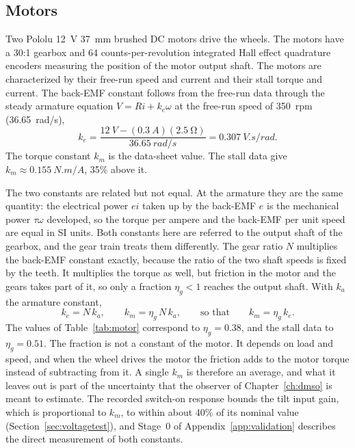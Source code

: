 \subsection{Motors}
\label{sec:motors}

Two Pololu \SI{12}{V} \SI{37}{mm} brushed DC motors drive the wheels. The
motors have a 30:1 gearbox and 64 counts-per-revolution integrated Hall effect
quadrature encoders measuring the position of the motor output shaft. The motors
are characterized by their free-run speed and current and their stall torque and
current. The back-EMF constant follows from the free-run data through the
steady armature equation $V=Ri+k_e\omega$ at the free-run speed of
\SI{350}{rpm} (\SI{36.65}{rad/s}),
\[
k_e=\frac{\SI{12}{V}-(\SI{0.3}{A})(\SI{2.5}{\ohm})}{\SI{36.65}{rad/s}}
=\SI{0.307}{V.s/rad}.
\]
The torque constant $k_m$ is the data-sheet value. The stall data give
$k_m\approx\SI{0.155}{N.m/A}$, 35\% above it.

The two constants are related but not equal. At the armature they are the same
quantity: the electrical power $ei$ taken up by the back-EMF $e$ is the
mechanical power $\tau\omega$ developed, so the torque per ampere and the
back-EMF per unit speed are equal in SI units. Both constants here are referred
to the output shaft of the gearbox, and the gear train treats them differently.
The gear ratio $N$ multiplies the back-EMF constant exactly, because the ratio
of the two shaft speeds is fixed by the teeth. It multiplies the torque as
well, but friction in the motor and the gears takes part of it, so only a
fraction $\eta_g<1$ reaches the output shaft. With $k_a$ the armature constant,
\begin{equation}\label{eq:kmke}
k_e=N\,k_a,\qquad k_m=\eta_g\,N\,k_a,\qquad\text{so that}\qquad k_m=\eta_g\,k_e .
\end{equation}
The values of Table~\ref{tab:motor} correspond to $\eta_g=0.38$, and the stall
data to $\eta_g=0.51$. The fraction is not a constant of the motor. It depends
on load and speed, and when the wheel drives the motor the friction adds to the
motor torque instead of subtracting from it. A single $k_m$ is therefore an
average, and what it leaves out is part of the uncertainty that the observer of
Chapter~\ref{ch:dmso} is meant to estimate. The recorded switch-on response
bounds the tilt input gain, which is proportional to $k_m$, to within about
40\% of its nominal value (Section~\ref{sec:voltagetest}), and Stage~0 of
Appendix~\ref{app:validation} describes the direct measurement of both
constants.

